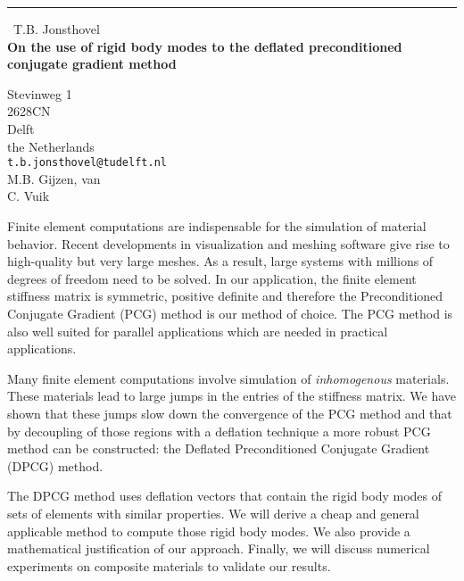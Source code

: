 \documentclass{report}
\begin{document}
\begin{center}
\rule{6in}{1pt} \
{\large T.B. Jonsthovel \\
{\bf On the use of rigid body modes to the deflated preconditioned conjugate gradient method}}

Stevinweg 1 \\ 2628CN \\ Delft \\ the Netherlands
\\
{\tt t.b.jonsthovel@tudelft.nl}\\
M.B. Gijzen, van\\
C. Vuik\end{center}

Finite element computations are indispensable for the simulation of
material behavior. Recent developments in visualization and meshing
software give rise to high-quality but very large meshes. As a result,
large systems with millions of degrees of freedom need to be solved. In
our application, the finite element stiffness matrix is symmetric,
positive definite and therefore the Preconditioned Conjugate Gradient
(PCG) method is our method of choice. The PCG method is also well suited
for parallel applications which are needed in practical applications.

Many finite element computations involve simulation of {\it inhomogenous}
materials. These materials lead to large jumps in the entries of the
stiffness matrix. We have shown that these jumps slow down the
convergence of the PCG method and that by decoupling of those regions
with a deflation technique a more robust PCG method can be constructed:
the Deflated Preconditioned Conjugate Gradient (DPCG) method.

The DPCG method uses deflation vectors that contain the rigid body modes
of sets of elements with similar properties. We will derive a cheap and
general applicable method to compute those rigid body modes. We also
provide a mathematical justification of our approach. Finally, we will
discuss numerical experiments on composite materials to validate our
results.
\end{document}
